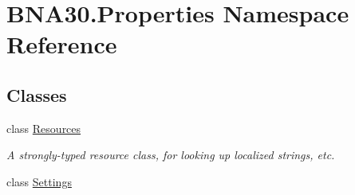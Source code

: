 \hypertarget{namespace_b_n_a30_1_1_properties}{}\section{B\+N\+A30.\+Properties Namespace Reference}
\label{namespace_b_n_a30_1_1_properties}
\subsection*{Classes}
\begin{DoxyCompactItemize}
\item 
class \mbox{\hyperlink{class_b_n_a30_1_1_properties_1_1_resources}{Resources}}
\begin{DoxyCompactList}\small\item\em A strongly-\/typed resource class, for looking up localized strings, etc. \end{DoxyCompactList}\item 
class \mbox{\hyperlink{class_b_n_a30_1_1_properties_1_1_settings}{Settings}}
\end{DoxyCompactItemize}
